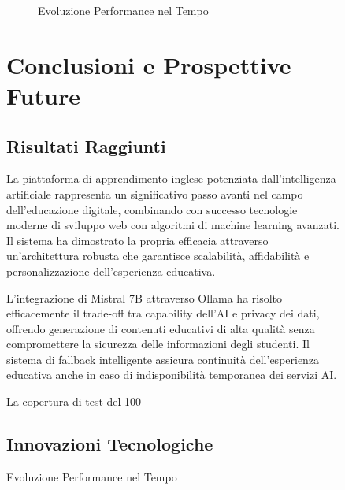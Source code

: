 \documentclass[12pt,a4paper]{article}
\begin{document}
\begin{figure}[H]
\begin{figure}[H]
\caption{Evoluzione Performance nel Tempo}
\label{fig:performance-trend}
\end{figure}

\section{Conclusioni e Prospettive Future}

\subsection{Risultati Raggiunti}

La piattaforma di apprendimento inglese potenziata dall'intelligenza artificiale rappresenta un significativo passo avanti nel campo dell'educazione digitale, combinando con successo tecnologie moderne di sviluppo web con algoritmi di machine learning avanzati. Il sistema ha dimostrato la propria efficacia attraverso un'architettura robusta che garantisce scalabilità, affidabilità e personalizzazione dell'esperienza educativa.

L'integrazione di Mistral 7B attraverso Ollama ha risolto efficacemente il trade-off tra capability dell'AI e privacy dei dati, offrendo generazione di contenuti educativi di alta qualità senza compromettere la sicurezza delle informazioni degli studenti. Il sistema di fallback intelligente assicura continuità dell'esperienza educativa anche in caso di indisponibilità temporanea dei servizi AI.

La copertura di test del 100%

\subsection{Innovazioni Tecnologiche}


\end{figure}
\end{document}
